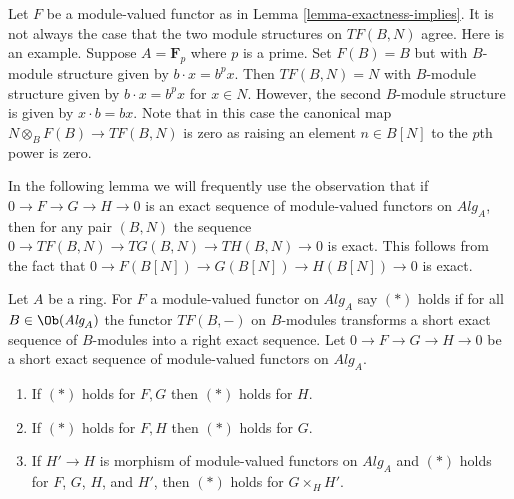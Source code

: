 \begin{example}
\label{example-module-structure-different}
Let $F$ be a module-valued functor as in
Lemma \ref{lemma-exactness-implies}.
It is not always the case that the two module structures on
$TF(B, N)$ agree. Here is an example. Suppose $A = \mathbf{F}_p$
where $p$ is a prime. Set $F(B) = B$ but with $B$-module structure
given by $b \cdot x = b^px$. Then $TF(B, N) = N$ with $B$-module structure
given by $b \cdot x = b^px$ for $x \in N$. However, the second $B$-module
structure is given by $x \cdot b = bx$. Note that in this case the canonical
map $N \otimes_B F(B) \to TF(B, N)$ is zero as raising an element
$n \in B[N]$ to the $p$th power is zero.
\end{example}

\noindent
In the following lemma we will frequently use the observation that
if $0 \to F \to G \to H \to 0$ is an exact sequence of module-valued
functors on $\textit{Alg}_A$, then for any pair $(B, N)$ the
sequence $0 \to TF(B, N) \to TG(B, N) \to TH(B, N) \to 0$ is exact.
This follows from the fact that $0 \to F(B[N]) \to G(B[N]) \to H(B[N]) \to 0$
is exact.

\begin{lemma}
\label{lemma-exactness-permanence}
Let $A$ be a ring. For $F$ a module-valued functor on $\textit{Alg}_A$
say $(*)$ holds if for all $B \in \Ob(\textit{Alg}_A)$ the
functor $TF(B, -)$ on $B$-modules transforms a short exact sequence
of $B$-modules into a right exact sequence. Let
$0 \to F \to G \to H \to 0$ be a short exact sequence of
module-valued functors on $\textit{Alg}_A$.
\begin{enumerate}
\item If $(*)$ holds for $F, G$ then $(*)$ holds for $H$.
\item If $(*)$ holds for $F, H$ then $(*)$ holds for $G$.
\item If $H' \to H$ is morphism of module-valued functors on $\textit{Alg}_A$
and $(*)$ holds for $F$, $G$, $H$, and $H'$, then $(*)$ holds for
$G \times_H H'$.
\end{enumerate}
\end{lemma}

